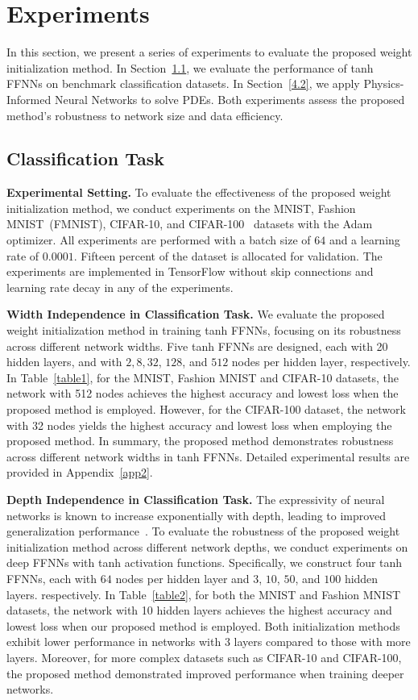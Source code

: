 \documentclass{article} \usepackage{iclr2025_conference,times}
\begin{document}
\section{Experiments}\label{section4}
In this section, we present a series of experiments to evaluate the proposed weight initialization method. In Section~\ref{4.1}, we evaluate the performance of tanh FFNNs on benchmark classification datasets. In Section~\ref{4.2}, we apply Physics-Informed Neural Networks to solve PDEs. Both experiments assess the proposed method's robustness to network size and data efficiency.



\subsection{Classification Task }\label{4.1}
\textbf{Experimental Setting.} To evaluate the effectiveness of the proposed weight initialization method, we conduct experiments on the MNIST, Fashion MNIST~(FMNIST), CIFAR-10, and CIFAR-100~\citep{krizhevsky2009learning} datasets with the Adam optimizer. All experiments are performed with a batch size of $64$ and a learning rate of $0.0001$.
Fifteen percent of the dataset is allocated for validation. The experiments are implemented in TensorFlow without skip connections and learning rate decay in any of the experiments. 

\textbf{Width Independence in Classification Task.}
We evaluate the proposed weight initialization method in training tanh FFNNs, focusing on its robustness across different network widths. Five tanh FFNNs are designed, each with 20 hidden layers, and with $2, 8, 32$, $128$, and $512$ nodes per hidden layer, respectively. In Table~\ref{table1}, for the MNIST, Fashion MNIST  and CIFAR-10 datasets, the network with 512 nodes achieves the highest accuracy and lowest loss when the proposed method is employed. However, for the CIFAR-100 dataset, the network with 32 nodes yields the highest accuracy and lowest loss when employing the proposed method. In summary, the proposed method demonstrates robustness across different network widths in tanh FFNNs. Detailed experimental results are provided in Appendix~\ref{app2}.


\textbf{Depth Independence in Classification Task.} The expressivity of neural networks is known to increase exponentially with depth, leading to improved generalization performance~\citep{poole2016exponential, raghu2017expressive}. To evaluate the robustness of the proposed weight initialization method across different network depths, we conduct experiments on deep FFNNs with tanh activation functions. Specifically, we construct four tanh FFNNs, each with $64$ nodes per hidden layer and $3$, $10$, $50$, and $100$ hidden layers. respectively. In Table~\ref{table2}, for both the MNIST and Fashion MNIST datasets, the network with 10 hidden layers achieves the highest accuracy and lowest loss when our proposed method is employed. Both initialization methods exhibit lower performance in networks with $3$ layers compared to those with more layers. Moreover, for more complex datasets such as CIFAR-10 and CIFAR-100, the proposed method demonstrated improved performance when training deeper networks. 
\end{document}
